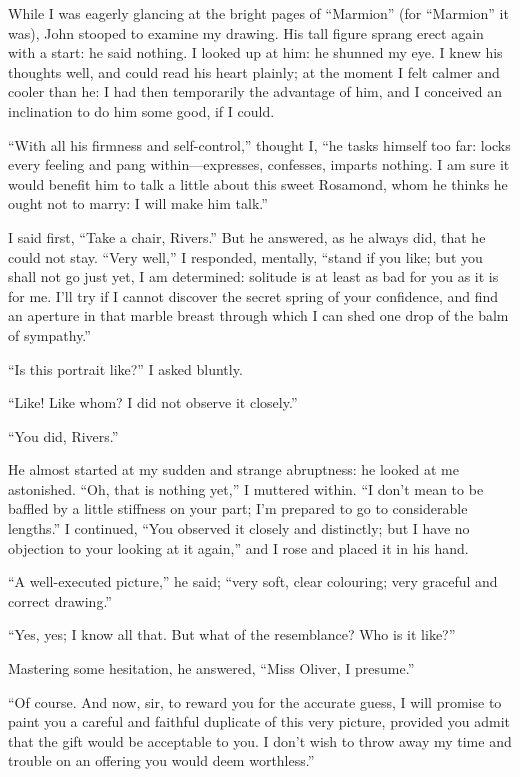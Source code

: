 While I was eagerly glancing at the bright pages of \enquote{Marmion}
(for \enquote{Marmion} it was), \St{} John stooped to examine my drawing. 
His tall figure sprang erect again with a start: he said nothing. I
looked up at him: he shunned my eye. I knew his thoughts well, and
could read his heart plainly; at the moment I felt calmer and cooler
than he: I had then temporarily the advantage of him, and I conceived an
inclination to do him some good, if I could.

\enquote{With all his firmness and self-control,} thought I, \enquote{he
tasks himself too far: locks every feeling and pang within---expresses,
confesses, imparts nothing. I am sure it would benefit him to talk a
little about this sweet Rosamond, whom he thinks he ought not to marry:
I will make him talk.}

I said first, \enquote{Take a chair, \Mr{} Rivers.} But he answered, as
he always did, that he could not stay. \enquote{Very well,} I
responded, mentally, \enquote{stand if you like; but you shall not go
just yet, I am determined: solitude is at least as bad for you as it is
for me. I'll try if I cannot discover the secret spring of your
confidence, and find an aperture in that marble breast through which I
can shed one drop of the balm of sympathy.}

\enquote{Is this portrait like?} I asked bluntly.

\enquote{Like! Like whom? I did not observe it closely.}

\enquote{You did, \Mr{} Rivers.}

He almost started at my sudden and strange abruptness: he looked at me
astonished. \enquote{Oh, that is nothing yet,} I muttered within. 
\enquote{I don't mean to be baffled by a little stiffness on your part;
I'm prepared to go to considerable lengths.} I continued, \enquote{You
observed it closely and distinctly; but I have no objection to your
looking at it again,} and I rose and placed it in his hand.

\enquote{A well-executed picture,} he said; \enquote{very soft, clear
colouring; very graceful and correct drawing.}

\enquote{Yes, yes; I know all that. But what of the resemblance? Who
is it like?}

Mastering some hesitation, he answered, \enquote{Miss Oliver, I
presume.}

\enquote{Of course. And now, sir, to reward you for the accurate guess,
I will promise to paint you a careful and faithful duplicate of this
very picture, provided you admit that the gift would be acceptable to
you. I don't wish to throw away my time and trouble on an offering you
would deem worthless.}

